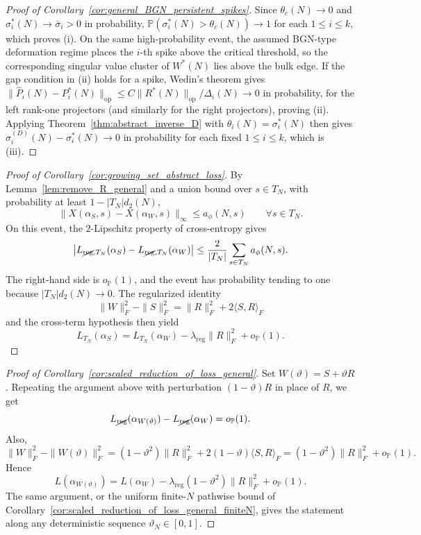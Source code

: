 \documentclass[11pt]{article}
\theoremstyle{plain}
\theoremstyle{definition}
\theoremstyle{remark}
\newcommand{\PP}{\mathbb{P}}
\newcommand{\1}{\mathbf{1}}
\begin{document}
\begin{proof}[Proof of Corollary~\ref{cor:general_BGN_persistent_spikes}]
Since \(\theta_c(N)\to0\) and \(\sigma_i^*(N)\to\bar\sigma_i>0\) in probability, \(\PP(\sigma_i^*(N)>\theta_c(N))\to1\) for each \(1\le i\le k\), which proves (i). On the same high-probability event, the assumed BGN-type deformation regime places the \(i\)-th spike above the critical threshold, so the corresponding singular value cluster of \(W^*(N)\) lies above the bulk edge. If the gap condition in (ii) holds for a spike, Wedin's theorem gives \(\|\widehat P_i(N)-P_i^*(N)\|_{\mathrm{op}}\le C\|R^*(N)\|_{\mathrm{op}}/\Delta_i(N)\to0\) in probability, for the left rank-one projectors (and similarly for the right projectors), proving (ii). Applying Theorem~\ref{thm:abstract_inverse_D} with \(\theta_i(N)=\sigma_i^*(N)\) then gives \(\widehat\sigma_i^{(D)}(N)-\sigma_i^*(N)\to0\) in probability for each fixed \(1\le i\le k\), which is (iii).
\end{proof}

\begin{proof}[Proof of Corollary~\ref{cor:growing_set_abstract_loss}]
By Lemma~\ref{lem:remove_R_general} and a union bound over \(s\in T_N\), with probability at least \(1-|T_N|d_2(N)\),
\[
\|X(\alpha_S,s)-X(\alpha_W,s)\|_\infty\le a_\phi(N,s)
\qquad\forall s\in T_N.
\]
On this event, the \(2\)-Lipschitz property of cross-entropy gives
\[
\left|
L_{\cancel{\mathrm{reg}},T_N}(\alpha_S)
-
L_{\cancel{\mathrm{reg}},T_N}(\alpha_W)
\right|
\le
\frac{2}{|T_N|}\sum_{s\in T_N}a_\phi(N,s).
\]
The right-hand side is \(o_{\PP}(1)\), and the event has probability tending to one because \(|T_N|d_2(N)\to0\). The regularized identity
\[
\|W\|_F^2-\|S\|_F^2
=
\|R\|_F^2+2\langle S,R\rangle_F
\]
and the cross-term hypothesis then yield
\[
L_{T_N}(\alpha_S)
=
L_{T_N}(\alpha_W)
-\lambda_{\mathrm{reg}}\|R\|_F^2
+o_{\PP}(1).
\]
\end{proof}

\begin{proof}[Proof of Corollary~\ref{cor:scaled_reduction_of_loss_general}]
Set \(W(\vartheta)=S+\vartheta R\). Repeating the argument above with perturbation \((1-\vartheta)R\) in place of \(R\), we get
\[
L_{\cancel{\mathrm{reg}}}(\alpha_{W(\vartheta)})-L_{\cancel{\mathrm{reg}}}(\alpha_W)=o_{\PP}(1).
\]
Also,
\[
\|W\|_F^2-\|W(\vartheta)\|_F^2
=
(1-\vartheta^2)\|R\|_F^2+2(1-\vartheta)\langle S,R\rangle_F
=
(1-\vartheta^2)\|R\|_F^2+o_{\PP}(1).
\]
Hence
\[
L(\alpha_{W(\vartheta)})
=
L(\alpha_W)-\lambda_{\mathrm{reg}}(1-\vartheta^2)\|R\|_F^2+o_{\PP}(1).
\]
The same argument, or the uniform finite-\(N\) pathwise bound of Corollary~\ref{cor:scaled_reduction_of_loss_general_finiteN}, gives the statement along any deterministic sequence \(\vartheta_N\in[0,1]\).
\end{proof}
\end{document}
